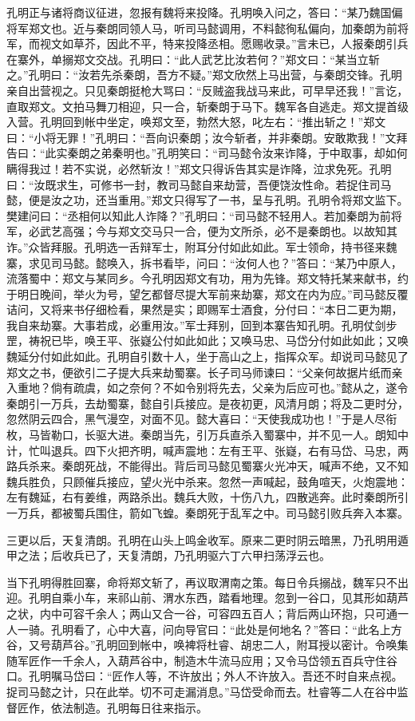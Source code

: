 孔明正与诸将商议征进，忽报有魏将来投降。孔明唤入问之，答曰：“某乃魏国偏将军郑文也。近与秦朗同领人马，听司马懿调用，不料懿徇私偏向，加秦朗为前将军，而视文如草芥，因此不平，特来投降丞相。愿赐收录。”言未已，人报秦朗引兵在寨外，单搦郑文交战。孔明曰：“此人武艺比汝若何？”郑文曰：“某当立斩之。”孔明曰：“汝若先杀秦朗，吾方不疑。”郑文欣然上马出营，与秦朗交锋。孔明亲自出营视之。只见秦朗挺枪大骂曰：“反贼盗我战马来此，可早早还我！”言讫，直取郑文。文拍马舞刀相迎，只一合，斩秦朗于马下。魏军各自逃走。郑文提首级入营。孔明回到帐中坐定，唤郑文至，勃然大怒，叱左右：“推出斩之！”郑文曰：“小将无罪！”孔明曰：“吾向识秦朗；汝今斩者，并非秦朗。安敢欺我！”文拜告曰：“此实秦朗之弟秦明也。”孔明笑曰：“司马懿令汝来诈降，于中取事，却如何瞒得我过！若不实说，必然斩汝！”郑文只得诉告其实是诈降，泣求免死。孔明曰：“汝既求生，可修书一封，教司马懿自来劫营，吾便饶汝性命。若捉住司马懿，便是汝之功，还当重用。”郑文只得写了一书，呈与孔明。孔明令将郑文监下。樊建问曰：“丞相何以知此人诈降？”孔明曰：“司马懿不轻用人。若加秦朗为前将军，必武艺高强；今与郑文交马只一合，便为文所杀，必不是秦朗也。以故知其诈。”众皆拜服。孔明选一舌辩军士，附耳分付如此如此。军士领命，持书径来魏寨，求见司马懿。懿唤入，拆书看毕，问曰：“汝何人也？”答曰：“某乃中原人，流落蜀中：郑文与某同乡。今孔明因郑文有功，用为先锋。郑文特托某来献书，约于明日晚间，举火为号，望乞都督尽提大军前来劫寨，郑文在内为应。”司马懿反覆诘问，又将来书仔细检看，果然是实；即赐军士酒食，分付曰：“本日二更为期，我自来劫寨。大事若成，必重用汝。”军士拜别，回到本寨告知孔明。孔明仗剑步罡，祷祝已毕，唤王平、张嶷公付如此如此；又唤马忠、马岱分付如此如此；又唤魏延分付如此如此。孔明自引数十人，坐于高山之上，指挥众军。却说司马懿见了郑文之书，便欲引二子提大兵来劫蜀寨。长子司马师谏曰：“父亲何故据片纸而亲入重地？倘有疏虞，如之奈何？不如令别将先去，父亲为后应可也。”懿从之，遂令秦朗引一万兵，去劫蜀寨，懿自引兵接应。是夜初更，风清月朗；将及二更时分，忽然阴云四合，黑气漫空，对面不见。懿大喜曰：“天使我成功也！”于是人尽衔枚，马皆勒口，长驱大进。秦朗当先，引万兵直杀入蜀寨中，并不见一人。朗知中计，忙叫退兵。四下火把齐明，喊声震地：左有王平、张嶷，右有马岱、马忠，两路兵杀来。秦朗死战，不能得出。背后司马懿见蜀寨火光冲天，喊声不绝，又不知魏兵胜负，只顾催兵接应，望火光中杀来。忽然一声喊起，鼓角喧天，火炮震地：左有魏延，右有姜维，两路杀出。魏兵大败，十伤八九，四散逃奔。此时秦朗所引一万兵，都被蜀兵围住，箭如飞蝗。秦朗死于乱军之中。司马懿引败兵奔入本寨。

三更以后，天复清朗。孔明在山头上鸣金收军。原来二更时阴云暗黑，乃孔明用遁甲之法；后收兵已了，天复清朗，乃孔明驱六丁六甲扫荡浮云也。

当下孔明得胜回寨，命将郑文斩了，再议取渭南之策。每日令兵搦战，魏军只不出迎。孔明自乘小车，来祁山前、渭水东西，踏看地理。忽到一谷口，见其形如葫芦之状，内中可容千余人；两山又合一谷，可容四五百人；背后两山环抱，只可通一人一骑。孔明看了，心中大喜，问向导官曰：“此处是何地名？”答曰：“此名上方谷，又号葫芦谷。”孔明回到帐中，唤裨将杜睿、胡忠二人，附耳授以密计。令唤集随军匠作一千余人，入葫芦谷中，制造木牛流马应用；又令马岱领五百兵守住谷口。孔明嘱马岱曰：“匠作人等，不许放出；外人不许放入。吾还不时自来点视。捉司马懿之计，只在此举。切不可走漏消息。”马岱受命而去。杜睿等二人在谷中监督匠作，依法制造。孔明每日往来指示。

